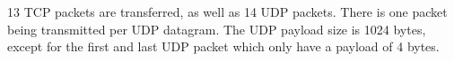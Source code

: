 13 TCP packets are transferred, as well as 14 UDP packets. There is one packet being transmitted per UDP datagram.
The UDP payload size is 1024 bytes, except for the first and last UDP packet which only have a payload of 4 bytes.